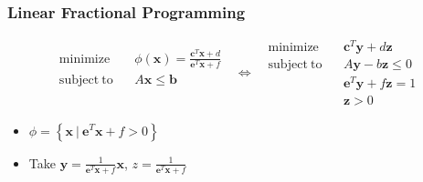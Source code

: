 \subsubsection*{Linear Fractional Programming}
$$ \begin{aligned}
    \mathrm{minimize}~~&~~\phi(\mathbf{x}) = \frac {\mathbf{c}^T\mathbf{x} + d} {\mathbf{e}^T \mathbf{x} + f} \\
    \mathrm{subject~to}~~&~~A\mathbf{x} \leq \mathbf{b} \\ {} \\ {}
\end{aligned}~~~\Leftrightarrow~~~\begin{aligned}
    \mathrm{minimize}~~&~~\mathbf{c}^T\mathbf{y} + d\mathbf{z} \\
    \mathrm{subject~to}~~&~~A\mathbf{y} - b\mathbf{z} \leq 0 \\
        &~~\mathbf{e}^T\mathbf{y} + f\mathbf{z} = 1\\
        &~~\mathbf{z} > 0
\end{aligned} $$
\begin{itemize}
    \item $\mathcal{\phi} = \left\{\mathbf{x}~|~\mathbf{e}^T\mathbf{x} + f > 0 \right\}$
    \item Take $\mathbf{y} = \frac 1 {\mathbf{e}^T\mathbf{x} + f}\mathbf{x}$, $z = \frac 1 {\mathbf{e}^T\mathbf{x} + f}$
\end{itemize}
